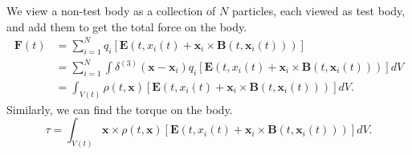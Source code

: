 We view a non-test body as a collection of \(N\) particles, each viewed as test body, and add them to get the total force on the body.
\begin{align*}
    \mathbf{F} (t) &= \sum\limits_{i=1}^{N} q_i [\mathbf{E} (t,x_i(t)+\mathbf{x}_i \times \mathbf{B} (t,\mathbf{x}_i(t)))]\\
    &= \sum\limits_{i=1}^{N} \int \delta^{(3)}(\mathbf{x} - \mathbf{x}_i) q_i [\mathbf{E} (t,x_i(t)+\mathbf{x}_i \times \mathbf{B} (t,\mathbf{x}_i(t)))] dV\\
    &= \int_{V(t)} \rho(t,\mathbf{x} ) [\mathbf{E} (t,x_i(t)+\mathbf{x}_i \times \mathbf{B} (t,\mathbf{x}_i(t)))] dV.
\end{align*}
Similarly, we can find the torque on the body.
\[
    \tau = \int_{V(t)}\mathbf{x} \times \rho(t,\mathbf{x} ) [\mathbf{E} (t,x_i(t)+\mathbf{x}_i \times \mathbf{B} (t,\mathbf{x}_i(t)))] dV.
\]


